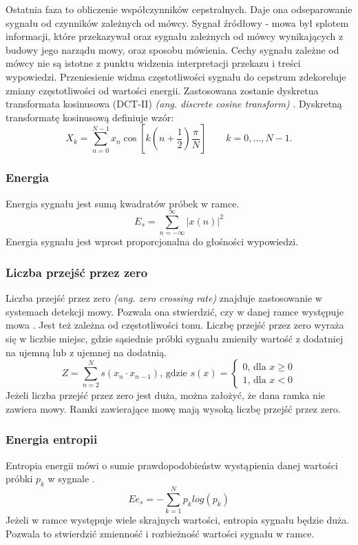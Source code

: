 \documentclass[a4paper,12pt,twoside,openany]{report}
\newcommand{\ang}[1]{\textit{(ang. #1)}}
\begin{document}
Ostatnia faza to obliczenie współczynników cepstralnych.
Daje ona odseparowanie sygnału od czynników zależnych od mówcy.
Sygnał źródłowy - mowa był splotem informacji,
które przekazywał oraz sygnału zależnych od mówcy wynikających z budowy jego narządu mowy, oraz sposobu mówienia.
Cechy sygnału zależne od mówcy nie są istotne z punktu widzenia interpretacji przekazu i treści wypowiedzi.
Przeniesienie widma częstotliwości sygnału do cepstrum zdekoreluje zmiany częstotliwości od wartości energii.
Zastosowana zostanie dyskretna transformata kosinusowa (DCT-II) \ang{discrete cosine transform} \cite{Hossan2013}.
Dyskretną transformatę kosinusową definiuje wzór:
\begin{equation}
	X_k =
	 \sum_{n=0}^{N-1} x_n \cos \left[k \left(n+\frac{1}{2}\right) \frac{\pi}{N} \right] \quad \quad k = 0, \dots, N-1.
\end{equation}


\subsubsection{Energia}
Energia sygnału jest sumą kwadratów próbek w ramce.
\begin{equation}
	E_{s}=\sum _{n=-\infty }^{\infty }{|x(n)|^{2}}
	\label{eq:energy}
\end{equation}
Energia sygnału jest wprost proporcjonalna do głośności wypowiedzi.
\subsubsection{Liczba przejść przez zero}
Liczba przejść przez zero \ang{zero crossing rate} znajduje zastosowanie w systemach detekcji mowy.
Pozwala ona stwierdzić, czy w danej ramce występuje mowa \cite{Walters-Williams2010}.
Jest też zależna od częstotliwości tonu. 
Liczbę przejść przez zero wyraża się w liczbie miejsc, gdzie sąsiednie próbki sygnału zmieniły wartość z dodatniej na ujemną lub z ujemnej na dodatnią.
\begin{equation}
	Z = \sum_{n=2}^{N}s(x_n \cdot x_{n-1})\text{, gdzie } s(x) = 
	\begin{cases} 
		0 \text{, dla } x \geq 0 \\
		1 \text{, dla } x < 0
	\end{cases}
	\label{eq:zcr}
\end{equation}
Jeżeli liczba przejść przez zero jest duża, można założyć, że dana ramka nie zawiera mowy.
Ramki zawierające mowę mają wysoką liczbę przejść przez zero.
\subsubsection{Energia entropii}
Entropia energii mówi o sumie prawdopodobieństw wystąpienia danej wartości próbki $p_k$ w sygnale \cite{Majstorovic2011}.
\begin{equation}
	Ee_{s}=-\sum _{k=1}^{N}p_k log(p_k)
	\label{eq:entropy_energy}
\end{equation}
Jeżeli w ramce występuje wiele skrajnych wartości, entropia sygnału będzie duża. 
Pozwala to stwierdzić zmienność i rozbieżność wartości sygnału w ramce.
\end{document}
